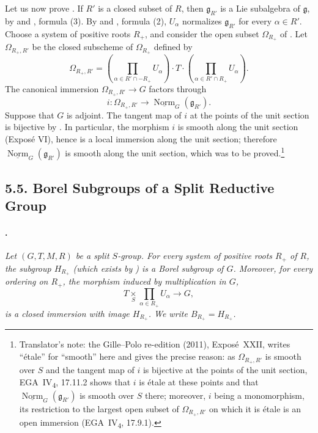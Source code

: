 Let us now prove . If \(R'\) is a closed subset of \(R\), then
\(\mathfrak g_{R'}\) is a Lie subalgebra of \(\mathfrak g\), by
 and , formula \textup{(3)}. By  and
, formula \textup{(2)}, \(U_\alpha\) normalizes
\(\mathfrak g_{R'}\) for every \(\alpha\in R'\). Choose a system of
positive roots \(R_+\), and consider the open subset
\(\Omega_{R_+}\) of . Let \(\Omega_{R_+,R'}\) be the closed
subscheme of \(\Omega_{R_+}\) defined by
\[
  \Omega_{R_+,R'}
  =
  \left(
    \prod_{\alpha\in R'\cap -R_+}U_\alpha
  \right)
  \cdot T\cdot
  \left(
    \prod_{\alpha\in R'\cap R_+}U_\alpha
  \right).
\]
The canonical immersion \(\Omega_{R_+,R'}\to G\) factors through
\[
  i:\Omega_{R_+,R'}
  \longrightarrow
  \underline{\operatorname{Norm}}_G(\mathfrak g_{R'}).
\]
Suppose that \(G\) is adjoint. The tangent map of \(i\) at the
points of the unit section is bijective by . In particular,
the morphism \(i\) is smooth along the unit section \textup{(Exposé VI)},
hence is a local immersion along the unit section; therefore
\(\underline{\operatorname{Norm}}_G(\mathfrak g_{R'})\) is smooth
along the unit section, which was to be proved.\footnote{Translator's note: the Gille--Polo re-edition (2011), Exposé~XXII,
writes ``étale'' for ``smooth'' here and gives the precise reason: as
\(\Omega_{R_+,R'}\) is smooth over \(S\) and the tangent map of \(i\) is bijective
at the points of the unit section, EGA~IV\textsubscript{4}, 17.11.2 shows that
\(i\) is étale at these points and that
\(\underline{\operatorname{Norm}}_G(\mathfrak g_{R'})\) is smooth over \(S\)
there; moreover, \(i\) being a monomorphism, its restriction to the largest
open subset of \(\Omega_{R_+,R'}\) on which it is étale is an open immersion
(EGA~IV\textsubscript{4}, 17.9.1).}

\subsection*{5.5. Borel Subgroups of a Split Reductive Group}

\paragraph{.}
\textit{Let \((G,T,M,R)\) be a split \(S\)-group. For every system
of positive roots \(R_+\) of \(R\), the subgroup \(H_{R_+}\)
\textup{(which exists by )} is a Borel subgroup of \(G\).
Moreover, for every ordering on \(R_+\), the morphism induced by
multiplication in \(G\),}
\[
  T\mathop{\times}\limits_S
  \prod_{\alpha\in R_+}U_\alpha
  \longrightarrow G,
\]
\textit{is a closed immersion with image \(H_{R_+}\). We write
\(B_{R_+}=H_{R_+}\).}

